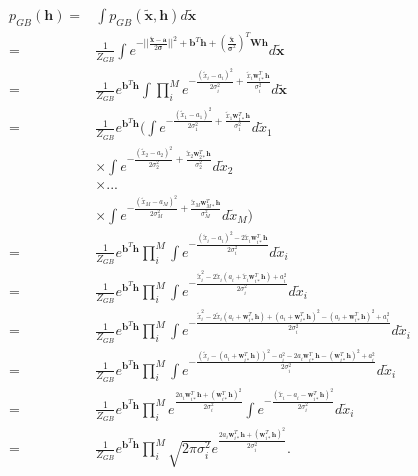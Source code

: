 \documentclass[%
oneside,                 %
final,                   %
10pt]{article}
\begin{document}
\begin{align}
	p_{GB} (\bm{h}) =& \int p_{GB} (\tilde{\bm{x}}, \bm{h}) d\tilde{\bm{x}} \nonumber \\
	=& \frac{1}{Z_{GB}} \int e^{-\vert\vert\frac{\tilde{\bm{x}} -\bm{a}}{2\bm{\sigma}}\vert\vert^2 + \bm{b}^T \bm{h} 
	+ (\frac{\tilde{\bm{x}}}{\bm{\sigma}^2})^T \bm{W}\bm{h}} d\tilde{\bm{x}} \nonumber \\
	=& \frac{1}{Z_{GB}} e^{\bm{b}^T \bm{h} } \int \prod_i^M
	e^{- \frac{(\tilde{x}_i - a_i)^2}{2\sigma_i^2} + \frac{\tilde{x}_i \bm{w}_{i\ast}^T \bm{h}}{\sigma_i^2} } d\tilde{\bm{x}} \nonumber \\
	=& \frac{1}{Z_{GB}} e^{\bm{b}^T \bm{h} }
	\biggl( \int e^{- \frac{(\tilde{x}_1 - a_1)^2}{2\sigma_1^2} + \frac{\tilde{x}_1 \bm{w}_{1\ast}^T \bm{h}}{\sigma_1^2} } d\tilde{x}_1 \nonumber \\
	& \times \int e^{- \frac{(\tilde{x}_2 - a_2)^2}{2\sigma_2^2} + \frac{\tilde{x}_2 \bm{w}_{2\ast}^T \bm{h}}{\sigma_2^2} } d\tilde{x}_2 \nonumber \\
	& \times ... \nonumber \\
	&\times \int e^{- \frac{(\tilde{x}_M - a_M)^2}{2\sigma_M^2} + \frac{\tilde{x}_M \bm{w}_{M\ast}^T \bm{h}}{\sigma_M^2} } d\tilde{x}_M \biggr) \nonumber \\
	=& \frac{1}{Z_{GB}} e^{\bm{b}^T \bm{h}} \prod_i^M
	\int e^{- \frac{(\tilde{x}_i - a_i)^2 - 2\tilde{x}_i \bm{w}_{i\ast}^T \bm{h}}{2\sigma_i^2} } d\tilde{x}_i \nonumber \\
	=& \frac{1}{Z_{GB}} e^{\bm{b}^T \bm{h}} \prod_i^M
	\int e^{- \frac{\tilde{x}_i^2 - 2\tilde{x}_i(a_i + \tilde{x}_i \bm{w}_{i\ast}^T \bm{h}) + a_i^2}{2\sigma_i^2} } d\tilde{x}_i \nonumber \\
	=& \frac{1}{Z_{GB}} e^{\bm{b}^T \bm{h}} \prod_i^M
	\int e^{- \frac{\tilde{x}_i^2 - 2\tilde{x}_i(a_i + \bm{w}_{i\ast}^T \bm{h}) + (a_i + \bm{w}_{i\ast}^T \bm{h})^2 - (a_i + \bm{w}_{i\ast}^T \bm{h})^2 + a_i^2}{2\sigma_i^2} } d\tilde{x}_i \nonumber \\
	=& \frac{1}{Z_{GB}} e^{\bm{b}^T \bm{h}} \prod_i^M
	\int e^{- \frac{(\tilde{x}_i - (a_i + \bm{w}_{i\ast}^T \bm{h}))^2 - a_i^2 -2a_i \bm{w}_{i\ast}^T \bm{h} - (\bm{w}_{i\ast}^T \bm{h})^2 + a_i^2}{2\sigma_i^2} } d\tilde{x}_i \nonumber \\
	=& \frac{1}{Z_{GB}} e^{\bm{b}^T \bm{h}} \prod_i^M
	e^{\frac{2a_i \bm{w}_{i\ast}^T \bm{h} +(\bm{w}_{i\ast}^T \bm{h})^2 }{2\sigma_i^2}}
	\int e^{- \frac{(\tilde{x}_i - a_i - \bm{w}_{i\ast}^T \bm{h})^2}{2\sigma_i^2}}
	d\tilde{x}_i \nonumber \\
	=& \frac{1}{Z_{GB}} e^{\bm{b}^T \bm{h}} \prod_i^M
	\sqrt{2\pi \sigma_i^2}
	e^{\frac{2a_i \bm{w}_{i\ast}^T \bm{h} +(\bm{w}_{i\ast}^T \bm{h})^2 }{2\sigma_i^2}} .
\end{align}
\end{document}
